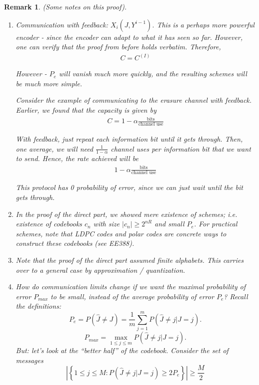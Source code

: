 \documentclass[13pt]{article}
\newtheorem*{remark}{Remark}
\newcommand{\T}{\text}
\begin{document}
\begin{remark} (Some notes on this proof).
  \begin{enumerate}
    \item Communication with feedback: $X_i(J, Y^{i-1})$.  This is a perhaps more powerful encoder - since the encoder can adapt to what it has seen so far.  However, one can verify that the proof from before holds verbatim.  Therefore,
      \begin{align*}
        C = C^{(I)} \tag{with or without feedback}
      \end{align*}

      However - $P_e$ will vanish much more quickly, and the resulting schemes will be much more simple.

      Consider the example of communicating to the erasure channel with feedback.  Earlier, we found that the capacity is given by
      \begin{align*}
        C = 1 - \alpha \frac{\T{bits}}{\T{channel use}}
      \end{align*}

      With feedback, just repeat each information bit until it gets through.  Then, one average, we will need $\frac{1}{1 - \alpha}$ channel uses per information bit that we want to send.  Hence, the rate achieved will be
      \begin{align*}
        1 - \alpha \frac{\T{bits}}{\T{channel use}}
      \end{align*}

      This protocol has 0 probability of error, since we can just wait until the bit gets through.

    \item In the proof of the direct part, we showed mere existence of schemes; i.e. existence of codebooks $c_n$ with size $|c_n| \geq 2^{nR}$ and small $P_e$.  For practical schemes, note that LDPC codes and polar codes are concrete ways to construct these codebooks (see EE388).

    \item Note that the proof of the direct part assumed finite alphabets.  This carries over to a general case by approximation / quantization.

    \item How do communication limits change if we want the maximal probability of error $P_{max}$ to be small, instead of the average probability of error $P_e$?  Recall the definitions:
      \[
        P_e = P(\hat{J} \neq J) = \frac{1}{m} \sum_{j=1}^{m} P(\hat{J} \neq j | J = j).
      \]
      \[
        P_{max} = \max_{1 \leq j \leq m} P(\hat{J} \neq j | J = j).
      \]
      But: let's look at the ``better half'' of the codebook.  Consider the set of messages 
      \[
        | \left\{ 1 \leq j \leq M: P(\hat{J} \neq j | J = j) \geq 2 P_e \right\} | \geq \frac{M}{2} \tag{by Markov's inequality}
      \]


\end{enumerate}
\end{remark}
\end{document}
